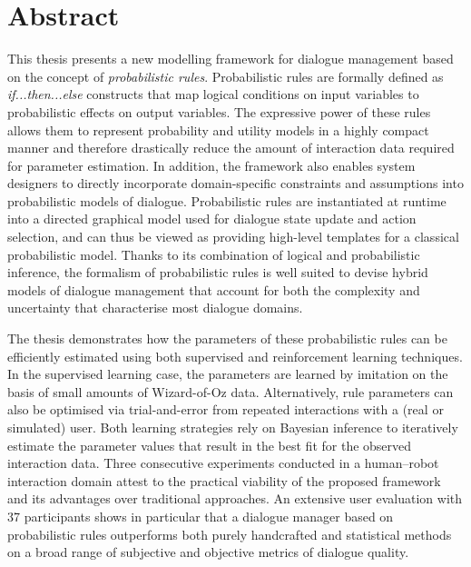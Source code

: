 \chapter*{Abstract}

This thesis presents a new modelling framework for dialogue management based on the concept of \textit{probabilistic rules}.  Probabilistic rules are formally defined as \textit{if...then...else} constructs that map logical conditions on input variables to probabilistic effects on output variables. The expressive power of these rules allows them to represent probability and utility models in a highly compact manner and therefore drastically reduce the amount of interaction data required for parameter estimation. In addition, the framework also enables system designers to directly incorporate domain-specific constraints and assumptions into probabilistic models of dialogue.  Probabilistic rules are instantiated at runtime into a directed graphical model used for dialogue state update and action selection, and can thus be viewed as providing high-level templates for a classical probabilistic model. Thanks to its combination of logical and probabilistic inference, the formalism of probabilistic rules is well suited to devise hybrid models of dialogue management that account for both the complexity and uncertainty that characterise most dialogue domains.

The thesis demonstrates how the parameters of these probabilistic rules can be efficiently estimated using both supervised and reinforcement learning techniques. In the supervised learning case, the parameters are learned by imitation on the basis of small amounts of Wizard-of-Oz data.  Alternatively, rule parameters can also be optimised via trial-and-error from repeated interactions with a (real or simulated) user. Both learning strategies rely on Bayesian inference to iteratively estimate the parameter values that result in the best fit for the observed interaction data. Three consecutive experiments conducted in a human--robot interaction domain attest to the practical viability of the proposed framework and its advantages over traditional approaches.  An extensive user evaluation with 37 participants shows in particular that a dialogue manager based on probabilistic rules outperforms both purely handcrafted and statistical methods on a broad range of subjective and objective metrics of dialogue quality.

